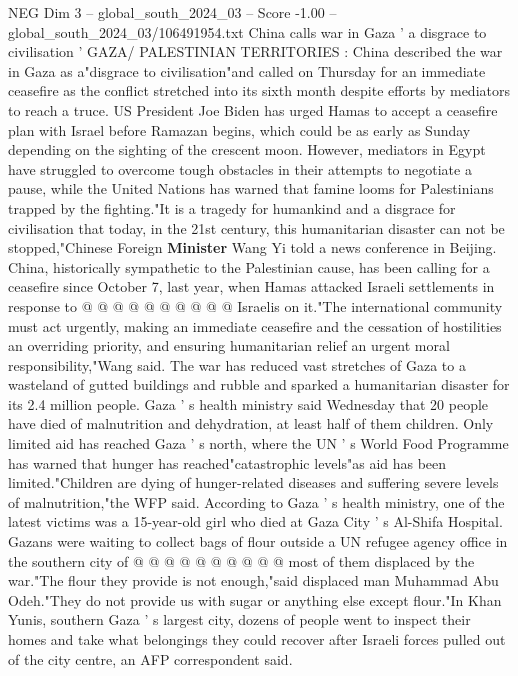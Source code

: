 \begin{textsample}{NEG Dim 3 – global\_south\_2024\_03 – Score -1.00 – global\_south\_2024\_03/106491954.txt}  \label{ex:f3_neg_049}
China calls war in Gaza ' a disgrace to civilisation ' GAZA/ PALESTINIAN TERRITORIES : China described the war in Gaza as a"disgrace to civilisation"and called on Thursday for an immediate ceasefire as the conflict stretched into its sixth month despite efforts by mediators to reach a truce.
US President Joe Biden has urged Hamas to accept a ceasefire plan with Israel before Ramazan begins, which could be as early as Sunday depending on the sighting of the crescent moon.
However, mediators in Egypt have struggled to overcome tough obstacles in their attempts to negotiate a pause, while the United Nations has warned that famine looms for Palestinians trapped by the fighting."It is a tragedy for humankind and a disgrace for civilisation that today, in the 21st century, this humanitarian disaster can not be stopped,"Chinese Foreign \textbf{Minister} Wang Yi told a news conference in Beijing.
China, historically sympathetic to the Palestinian cause, has been calling for a ceasefire since October 7, last year, when Hamas attacked Israeli settlements in response to @ @ @ @ @ @ @ @ @ @ Israelis on it."The international community must act urgently, making an immediate ceasefire and the cessation of hostilities an overriding priority, and ensuring humanitarian relief an urgent moral responsibility,"Wang said.
The war has reduced vast stretches of Gaza to a wasteland of gutted buildings and rubble and sparked a humanitarian disaster for its 2.4 million people.
Gaza ' s health ministry said Wednesday that 20 people have died of malnutrition and dehydration, at least half of them children.
Only limited aid has reached Gaza ' s north, where the UN ' s World Food Programme has warned that hunger has reached"catastrophic levels"as aid has been limited."Children are dying of hunger-related diseases and suffering severe levels of malnutrition,"the WFP said.
According to Gaza ' s health ministry, one of the latest victims was a 15-year-old girl who died at Gaza City ' s Al-Shifa Hospital.
Gazans were waiting to collect bags of flour outside a UN refugee agency office in the southern city of @ @ @ @ @ @ @ @ @ @ most of them displaced by the war."The flour they provide is not enough,"said displaced man Muhammad Abu Odeh."They do not provide us with sugar or anything else except flour."In Khan Yunis, southern Gaza ' s largest city, dozens of people went to inspect their homes and take what belongings they could recover after Israeli forces pulled out of the city centre, an AFP correspondent said.

\end{textsample}
